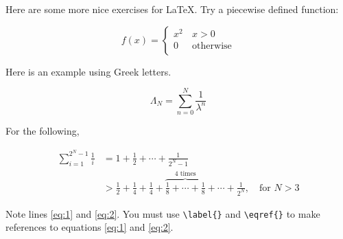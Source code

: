 \documentclass[10pt, reqno]{article}
\begin{document}
Here are some more nice exercises for \LaTeX. Try a piecewise defined function:

\[ 
f(x)=\begin{cases}
		x^2 \, &x > 0 \\
		0 \, &\text{otherwise} \\
	 \end{cases}
\]

Here is an example using Greek letters.

\[ 
\Lambda_N = \sum_{n=0}^N \frac{1}{\lambda^n}
\]



For the following, 	

\begin{align}
\sum_{i = 1}^{2^N - 1} \frac{1}{i} &= 1 + \frac{1}{2} + \cdots + \frac{1}{2^N - 1} \label{eq:1}\\
&> \frac{1}{2}+\frac{1}{4}+\frac{1}{4}+\overbrace{\frac{1}{8}+\cdots+\frac{1}{8}}^{\text{4 times}} + \cdots + \frac{1}{2^N}, \quad \text{for }N>3 \label{eq:2}
\end{align}

\noindent Note lines \eqref{eq:1} and \eqref{eq:2}. You must use \verb+\label{}+ and \verb+\eqref{}+ to make references to equations \eqref{eq:1} and \eqref{eq:2}.
\end{document}

